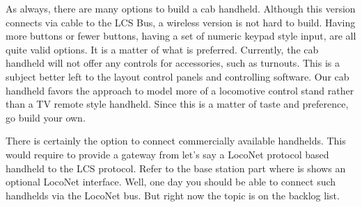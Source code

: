 As always, there are many options to build a cab handheld. Although this version connects via cable to the LCS Bus, a wireless version is not hard to build. Having more buttons or fewer buttons, having a set of numeric keypad style input, are all quite valid options. It is a matter of what is preferred. Currently, the cab handheld will not offer any controls for accessories, such as turnouts. This is a subject better left to the layout control panels and controlling software. Our cab handheld favors the approach to model more of a locomotive control stand rather than a TV remote style handheld. Since this is a matter of taste and preference, go build your own.

There is certainly the option to connect commercially available handhelds. This would require to provide a gateway from let's say a LocoNet protocol based handheld to the LCS protocol. Refer to the base station part where is shows an optional LocoNet interface. Well, one day you should be able to connect such handhelds via the LocoNet bus. But right now the topic is on the backlog list.